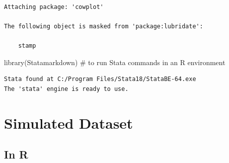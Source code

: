 \documentclass[
  letterpaper,
  DIV=11,
  numbers=noendperiod]{scrreprt}
\newenvironment{Shaded}{\begin{snugshade}}{\end{snugshade}}
\newcommand{\AttributeTok}[1]{\textcolor[rgb]{0.40,0.45,0.13}{#1}}
\newcommand{\CommentTok}[1]{\textcolor[rgb]{0.37,0.37,0.37}{#1}}
\newcommand{\FunctionTok}[1]{\textcolor[rgb]{0.28,0.35,0.67}{#1}}
\newcommand{\NormalTok}[1]{\textcolor[rgb]{0.00,0.23,0.31}{#1}}
\newcommand{\OtherTok}[1]{\textcolor[rgb]{0.00,0.23,0.31}{#1}}
\newcommand{\SpecialCharTok}[1]{\textcolor[rgb]{0.37,0.37,0.37}{#1}}
\newcommand{\StringTok}[1]{\textcolor[rgb]{0.13,0.47,0.30}{#1}}
\begin{document}
\begin{verbatim}

Attaching package: 'cowplot'

The following object is masked from 'package:lubridate':

    stamp
\end{verbatim}

\begin{Shaded}
\begin{Highlighting}[]
\FunctionTok{library}\NormalTok{(Statamarkdown) }\CommentTok{\# to run Stata commands in an R environment}
\end{Highlighting}
\end{Shaded}

\begin{verbatim}
Stata found at C:/Program Files/Stata18/StataBE-64.exe
The 'stata' engine is ready to use.
\end{verbatim}

\begin{Shaded}
\end{Shaded}

\section{Simulated Dataset}\label{simulated-dataset}

\subsection{In R}\label{in-r}
\end{document}
